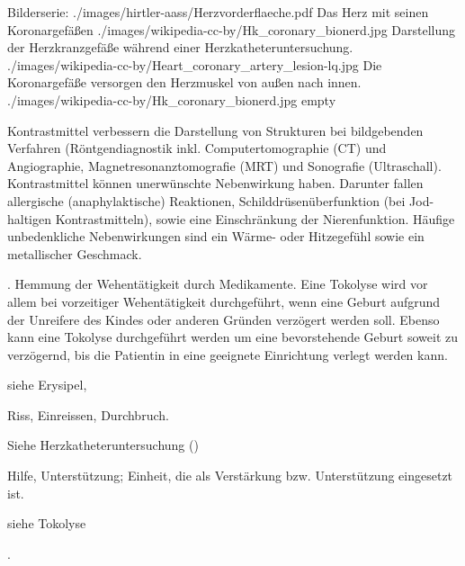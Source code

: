\documentclass[
ngerman,
paper=a4,
asymmetric,
fontsize=10pt,
draft=false,
numbers=noenddot,
bibtotocnumbered,
footnotes=multiple,
]{scrreprt}
\newcommand{\jNEUende}{\newline{\color{green}\rule{\linewidth}{3pt}\newline}}
\begin{document}
\begin{description}
  \begin{PictureSeriesWide}{}{Bilderserie:
    }
    {./images/hirtler-aass/Herzvorderflaeche.pdf}
    {Das Herz mit seinen Koronargefäßen }
    {./images/wikipedia-cc-by/Hk_coronary_bionerd.jpg}
    {Darstellung der
    Herzkranzgefäße während einer Herzkatheteruntersuchung.
    }
    {./images/wikipedia-cc-by/Heart_coronary_artery_lesion-lq.jpg}
    {Die Koronargefäße versorgen den
    Herzmuskel von außen nach innen. } {./images/wikipedia-cc-by/Hk_coronary_bionerd.jpg}
    {empty}
    {}
  \end{PictureSeriesWide}
  \item[\IX{Kontrastmittel}] \label{topic:kontrasmittel}
  Kontrastmittel verbessern die Darstellung von Strukturen
  bei bildgebenden Verfahren (Röntgendiagnostik inkl.
  Computertomographie (CT) und Angiographie,
  Magnetresonanztomografie (MRT) und Sonografie (Ultraschall). Kontrastmittel können
  unerwünschte Nebenwirkung haben. Darunter fallen
  allergische (anaphylaktische) Reaktionen,
  Schilddrüsenüberfunktion (bei Jod-haltigen
  Kontrastmitteln), sowie eine Einschränkung der
  Nierenfunktion. Häufige unbedenkliche Nebenwirkungen sind
  ein Wärme- oder Hitzegefühl sowie ein metallischer
  Geschmack.
  \item[\IX{Tokolyse}]  . Hemmung
  der Wehentätigkeit durch Medikamente. Eine Tokolyse wird
  vor allem bei vorzeitiger Wehentätigkeit durchgeführt,
  wenn eine Geburt aufgrund der Unreifere des Kindes oder
  anderen Gründen verzögert werden soll. Ebenso kann eine
  Tokolyse durchgeführt werden um eine bevorstehende Geburt
  soweit zu verzögernd, bis die Patientin in eine geeignete
  Einrichtung verlegt werden kann.
  \item[\IX{retten}]
  \item[\IX{Rotlauf}] siehe Erysipel, 
  \item[\IX{Ruptur}] Riss, Einreissen, Durchbruch.
  \item[\IX{Sofortbehandlung}]
  \item[\IX{Sofortmaßnahmen, lebensrettende}]
  \item[Stent] Siehe Herzkatheteruntersuchung
  ()
  \item[\IX{Sukkurs}] Hilfe, Unterstützung; Einheit, die
  als Verstärkung bzw. Unterstützung eingesetzt ist.
  \item[\IX{Wehenhemmung}] siehe Tokolyse
\end{description}
.
\jNEUende
\end{document}
